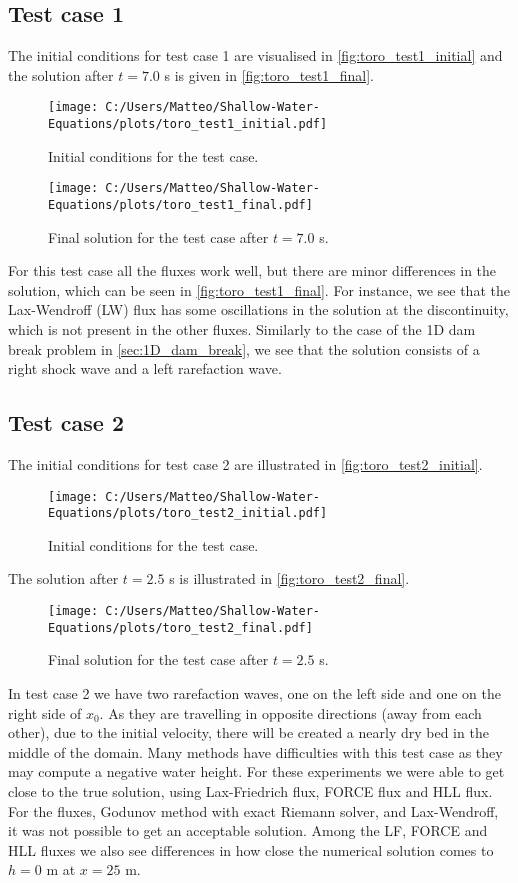 \subsection*{Test case 1}
The initial conditions for test case 1 are visualised in \autoref{fig:toro_test1_initial} and the solution after $t=7.0$ s is given in \autoref{fig:toro_test1_final}.
\begin{figure}[H]
    \centering
    \texttt{[image: C:/Users/Matteo/Shallow-Water-Equations/plots/toro\_test1\_initial.pdf]}
    \caption{Initial conditions for the test case.}\label{fig:toro_test1_initial}
\end{figure}
\begin{figure}[H]
    \centering
    \texttt{[image: C:/Users/Matteo/Shallow-Water-Equations/plots/toro\_test1\_final.pdf]}
    \caption{Final solution for the test case after $t=7.0$ s.}\label{fig:toro_test1_final}
\end{figure}
For this test case all the fluxes work well, but there are minor differences in the solution, which can be seen in \autoref{fig:toro_test1_final}.
For instance, we see that the Lax-Wendroff (LW) flux has some oscillations in the solution at the discontinuity, which is not present in the other fluxes.
Similarly to the case of the 1D dam break problem in \autoref{sec:1D_dam_break}, we see that the solution consists of a right shock wave and a left rarefaction wave.

\newpage
\subsection*{Test case 2}
The initial conditions for test case 2 are illustrated in \autoref{fig:toro_test2_initial}.
\begin{figure}[H]
    \centering
    \texttt{[image: C:/Users/Matteo/Shallow-Water-Equations/plots/toro\_test2\_initial.pdf]}
    \caption{Initial conditions for the test case.}\label{fig:toro_test2_initial}
\end{figure}
The solution after $t = 2.5$ s is illustrated in \autoref{fig:toro_test2_final}.
\begin{figure}[H]
    \centering
    \texttt{[image: C:/Users/Matteo/Shallow-Water-Equations/plots/toro\_test2\_final.pdf]}
    \caption{Final solution for the test case after $t = 2.5$ s.}\label{fig:toro_test2_final}
\end{figure}
In test case 2 we have two rarefaction waves, one on the left side and one on the right side of $x_0$.
As they are travelling in opposite directions (away from each other), due to the initial velocity, there will be created a nearly dry bed in the middle of the domain.
Many methods have difficulties with this test case as they may compute a negative water height.
For these experiments we were able to get close to the true solution, using Lax-Friedrich flux, FORCE flux and HLL flux.
For the fluxes, Godunov method with exact Riemann solver, and Lax-Wendroff, it was not possible to get an acceptable solution.
Among the LF, FORCE and HLL fluxes we also see differences in how close the numerical solution comes to $h = 0$ m at $x = 25$ m.

